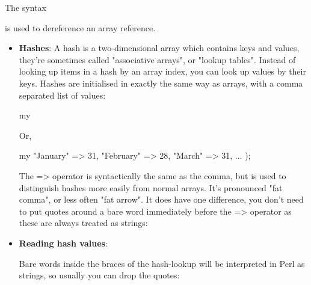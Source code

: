 \documentclass{report}
\begin{document}
\begin{itemize}
            \bigbreak \noindent 
            The syntax
            \bigbreak \noindent 
            \bigbreak \noindent 
            is used to dereference an array reference.


    \end{itemize}

    \pagebreak 
    \begin{itemize}
        \item \textbf{Hashes}: A hash is a two-dimensional array which contains keys and values, they’re sometimes called "associative arrays", or "lookup tables". Instead of looking up items in a hash by an array index, you can look up values by their keys.        
            \bigbreak \noindent 
            Hashes are initialised in exactly the same way as arrays, with a comma separated list of values:
            \bigbreak \noindent 
            \begin{perlcode}
            my %
            \end{perlcode}
            \bigbreak \noindent 
            Or,
            \bigbreak \noindent 
            \begin{perlcode}
                my %
                    "January" => 31,
                    "February" => 28,
                    "March" => 31,
                    ...
                );
            \end{perlcode}
            \bigbreak \noindent 
            The => operator is syntactically the same as the comma, but is used to distinguish hashes more easily from normal arrays. It’s pronounced "fat comma", or less often "fat arrow". It does have one difference, you don’t need to put quotes around a bare word immediately before the => operator as these are always treated as strings:
        \item \textbf{Reading hash values}: 
            \bigbreak \noindent 
            \bigbreak \noindent 
            Bare words inside the braces of the hash-lookup will be interpreted in Perl as strings, so usually you can drop the quotes:

\end{itemize}
\end{document}
